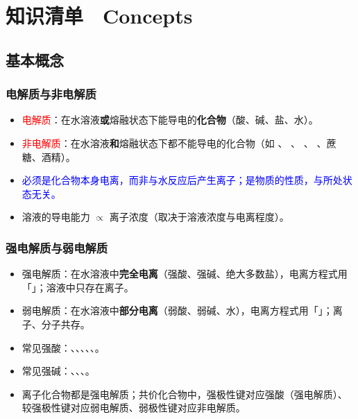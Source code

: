 \chapter{知识清单　Concepts}\label{appendix:知识清单}

    \section{基本概念}\label{app:知识点-基本概念}

        \subsection{电解质与非电解质}

            \begin{itemize}
                \item \textcolor{red}{电解质}：在水溶液\textbf{或}熔融状态下能导电的\textbf{化合物}（酸、碱、盐、水）。
                \item \textcolor{red}{非电解质}：在水溶液\textbf{和}熔融状态下都不能导电的化合物（如 、 、 、 、蔗糖、酒精）。
                \item \textcolor{blue}{必须是化合物本身电离，而非与水反应后产生离子；是物质的性质，与所处状态无关。}
                \item 溶液的导电能力 \(\propto\) 离子浓度（取决于溶液浓度与电离程度）。
            \end{itemize}

        \subsection{强电解质与弱电解质}

            \begin{itemize}
                \item 强电解质：在水溶液中\textbf{完全电离}（强酸、强碱、绝大多数盐），电离方程式用「\cemh{\xleq{}}」；溶液中只存在离子。
                \item 弱电解质：在水溶液中\textbf{部分电离}（弱酸、弱碱、水），电离方程式用「\cemh{<=>}」；离子、分子共存。
                \item 常见强酸：、、、、、。
                \item 常见强碱：、、、。
                \item 离子化合物都是强电解质；共价化合物中，强极性键对应强酸（强电解质）、较强极性键对应弱电解质、弱极性键对应非电解质。
            \end{itemize}

